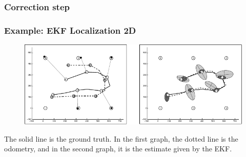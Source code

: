     \begin{frame}
    \frametitle{Correction step}
    
    \begin{figure}[!h]
    \centering
    \end{figure}
    
    \end{frame}
    
    \begin{frame}
    \frametitle{Example: EKF Localization 2D}
    
    \begin{figure}[!h]
    \includegraphics[width=\columnwidth]{./images/ekf_localization_example.pdf}
    \end{figure}
    
    The solid line is the ground truth. In the first graph, the dotted line is the odometry, and in the second graph, it is the estimate given by the EKF.
    
    \end{frame}
    
